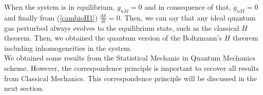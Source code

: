 \documentclass{article}
\newcommand{\Ss}{\mathcal{S}}
\begin{document}
When the system is in equilibrium, $g_{nM}=0$ and in consequence of that, $\dot g_{nM}=0$ and finally from (\ref{cambioH1}) $\frac{d\Ss}{dt}=0$. Then, we can say that any ideal quantum gas perturbed always evolves to the equilibrium state, such as the classical $H$ theorem. Then, we obtained the quantum version of the Boltzmann's $H$ theorem including inhomogeneities in the system.\\
We obtained some results from the Statistical Mechanic in Quantum Mechanics scheme. However, the correspondence principle is important to recover all results from Classical Mechanics. This correspondence principle will be discussed in the next section.

  

\end{document}
